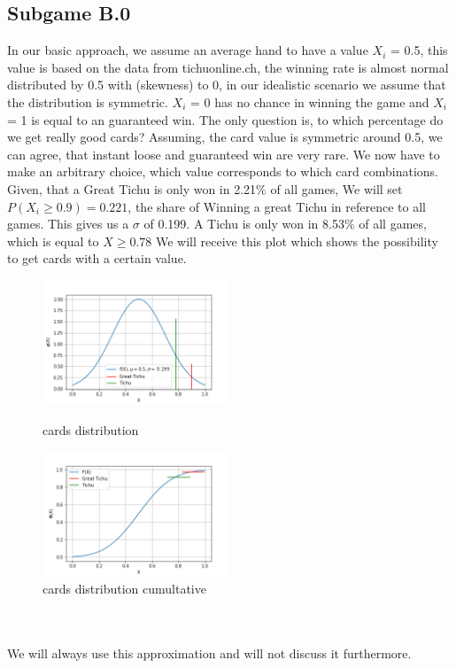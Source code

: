 \subsection{Subgame B.0}
In our basic approach, we assume an average hand to have a value $X_i$ = 0.5, this value is based on the data from tichuonline.ch, the winning rate is almost normal distributed by 0.5 with (skewness) to 0, in our idealistic scenario we assume that the distribution is symmetric. $X_i$ = 0 has no chance in winning the game and $X_i$ = 1 is equal to an guaranteed win. The only question is, to which percentage do we get really good cards? Assuming, the card value is symmetric around 0.5, we can agree, that instant loose and guaranteed win are very rare. We now have to make an arbitrary choice, which value corresponds to which card combinations. 
Given, that a Great Tichu is only won in 2.21$\%$ of all games, We will set $P(X_i \geq 0.9) = 0.221$, the share of Winning a great Tichu in reference to all games. This gives us a $\sigma$ of 0.199. A Tichu is only won in 8.53$\%$ of all games, which is equal to $X \geq 0.78$
We will receive this plot which shows the possibility to get cards with a certain value.
\begin{figure}[h]
    \centering
    \includegraphics[width=0.5\textwidth]{Bilder/cards_distribution}
    \caption{cards distribution}
    \label{fig:meine-grafik}
    \centering
    \includegraphics[width=0.5\textwidth]{Bilder/cards_distribution_cumultative}
    \caption{cards distribution cumultative}
    \label{fig:meine-grafik}
\end{figure}
\\ \\We will always use this approximation and will not discuss it furthermore.
